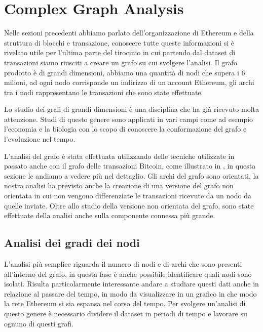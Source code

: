 \documentclass[12pt]{report}
\begin{document}
\newpage
\chapter{Complex Graph Analysis}

Nelle sezioni precedenti abbiamo parlato dell'organizzazione di Ethereum e della struttura di blocchi e transazione, conoscere tutte queste informazioni si è rivelato utile per l'ultima parte del tirocinio in cui partendo dal dataset di transazioni siamo riusciti a creare un grafo su cui svolgere l'analisi.
Il grafo prodotto è di grandi dimensioni, abbiamo una quantità di nodi che supera i 6 milioni, ad ogni nodo corrisponde un indirizzo di un account Ethereum, gli archi tra i nodi rappresentano le transazioni che sono state effettuate.

Lo studio dei grafi di grandi dimensioni è una disciplina che ha già ricevuto molta attenzione. Studi di questo genere sono applicati in vari campi come ad esempio l'economia e la biologia con lo scopo di conoscere la conformazione del grafo e l'evoluzione nel tempo.

L'analisi del grafo è stata effettuata utilizzando delle tecniche utilizzate in passato anche con il grafo delle transazioni Bitcoin, come illustrato in \cite{maesa2016uncovering} \cite{maesa2016analysis} \cite{maesa2017data} \cite{maesa2017detecting}, in questa sezione le andiamo a vedere più nel dettaglio.
Gli archi del grafo sono orientati, la nostra analisi ha previsto anche la creazione di una versione del grafo non orientata in cui non vengono differenziate le transazioni ricevute da un nodo da quelle inviate. Oltre allo studio della versione non orientata del grafo, sono state effettuate della analisi anche sulla componente connessa più grande.
\newpage
\section{Analisi dei gradi dei nodi}

L'analisi più semplice riguarda il numero di nodi e di archi che sono presenti all'interno del grafo, in questa fase è anche possibile identificare quali nodi sono isolati.
Risulta particolarmente interessante andare a studiare questi dati anche in relazione al passare del tempo, in modo da visualizzare in un grafico in che modo la rete Ethereum si sia espansa nel corso del tempo. 
Per svolgere un'analisi di questo genere è necessario dividere il dataset in periodi di tempo e lavorare su ognuno di questi grafi.
\end{document}

